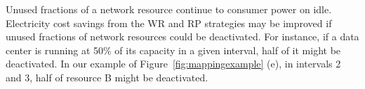 Unused fractions of a network resource continue to consumer power on idle. Electricity cost savings from the WR and RP strategies may be improved if unused fractions of network resources could be deactivated. For instance, if a data center is running at 50\% of its capacity in a given interval, half of it might be deactivated. In our example of Figure~\ref{fig:mappingexample} (e), in intervals 2 and 3, half of resource B might be deactivated. 

%
%
